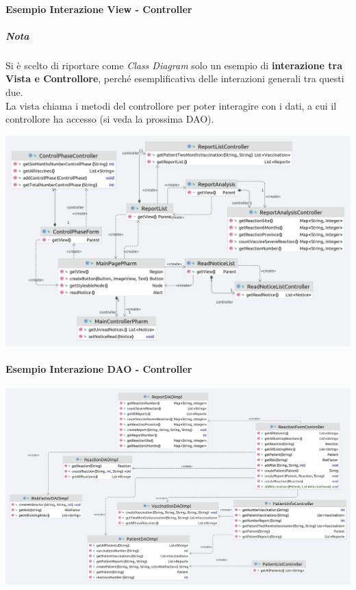 \documentclass[11pt]{article}
\begin{document}
        \paragraph*{Esempio Interazione View - Controller}
            \subparagraph*{Nota} Si è scelto di riportare come \textit{Class Diagram} solo un esempio di \textbf{interazione tra Vista e Controllore}, perché esemplificativa delle interazioni generali tra questi due.\\
            La vista chiama i metodi del controllore per poter interagire con i dati, a cui il controllore ha accesso (si veda la prossima DAO).
            \begin{center}
                \includegraphics[width=1\textwidth]{pictures/ExampleControlViewInteraction.png}
            \end{center}
    \newpage
        \paragraph*{Esempio Interazione DAO - Controller}
            \begin{center}
                \includegraphics[width=1\textwidth]{pictures/ControllerDati.png}
            \end{center}
\end{document}
